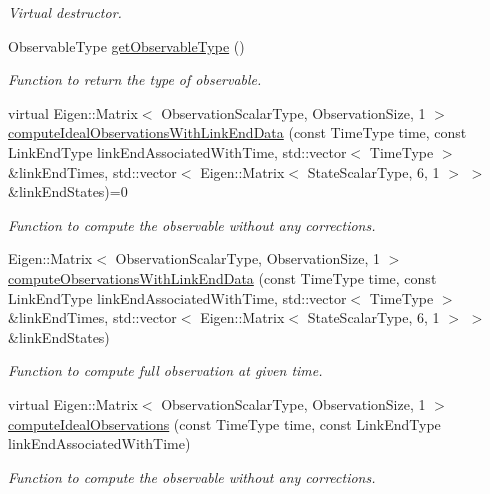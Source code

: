 \begin{DoxyCompactItemize}
\begin{DoxyCompactList}\small\item\em Virtual destructor. \end{DoxyCompactList}\item 
Observable\+Type \hyperlink{classtudat_1_1observation__models_1_1ObservationModel_aa13d8f8170c751ddfba26bc48ec0cb14}{get\+Observable\+Type} ()
\begin{DoxyCompactList}\small\item\em Function to return the type of observable. \end{DoxyCompactList}\item 
virtual Eigen\+::\+Matrix$<$ Observation\+Scalar\+Type, Observation\+Size, 1 $>$ \hyperlink{classtudat_1_1observation__models_1_1ObservationModel_aaa82da2eb90342259242e4cf06c7e3ff}{compute\+Ideal\+Observations\+With\+Link\+End\+Data} (const Time\+Type time, const Link\+End\+Type link\+End\+Associated\+With\+Time, std\+::vector$<$ Time\+Type $>$ \&link\+End\+Times, std\+::vector$<$ Eigen\+::\+Matrix$<$ State\+Scalar\+Type, 6, 1 $>$ $>$ \&link\+End\+States)=0
\begin{DoxyCompactList}\small\item\em Function to compute the observable without any corrections. \end{DoxyCompactList}\item 
Eigen\+::\+Matrix$<$ Observation\+Scalar\+Type, Observation\+Size, 1 $>$ \hyperlink{classtudat_1_1observation__models_1_1ObservationModel_a68f35de1a7471f738ff13d72971853e5}{compute\+Observations\+With\+Link\+End\+Data} (const Time\+Type time, const Link\+End\+Type link\+End\+Associated\+With\+Time, std\+::vector$<$ Time\+Type $>$ \&link\+End\+Times, std\+::vector$<$ Eigen\+::\+Matrix$<$ State\+Scalar\+Type, 6, 1 $>$ $>$ \&link\+End\+States)
\begin{DoxyCompactList}\small\item\em Function to compute full observation at given time. \end{DoxyCompactList}\item 
virtual Eigen\+::\+Matrix$<$ Observation\+Scalar\+Type, Observation\+Size, 1 $>$ \hyperlink{classtudat_1_1observation__models_1_1ObservationModel_a72d060cec8d6cc8f0e6109d6d09e53ec}{compute\+Ideal\+Observations} (const Time\+Type time, const Link\+End\+Type link\+End\+Associated\+With\+Time)
\begin{DoxyCompactList}\small\item\em Function to compute the observable without any corrections. \end{DoxyCompactList}\item 

\end{DoxyCompactItemize}
